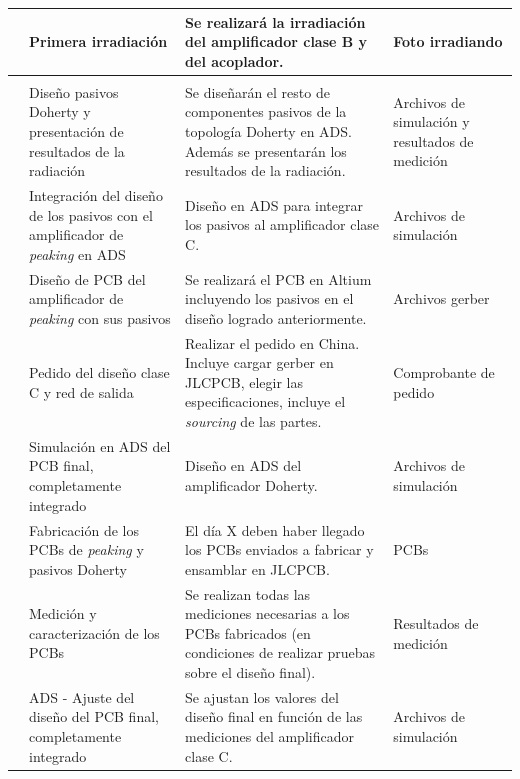 \begin{xltabular}{\textwidth}{>{\centering\arraybackslash}p{0.6cm} X X p{2.5cm}}
     & Primera irradiación & Se realizará la irradiación del amplificador clase B y del acoplador. & Foto irradiando \\
    
    \hline
      \\
    
     & Diseño pasivos Doherty y presentación de resultados de la radiación & Se diseñarán el resto de componentes pasivos de la topología Doherty en ADS. Además se presentarán los resultados de la radiación. & Archivos de simulación y resultados de medición \\
    
     & Integración del diseño de los pasivos con el amplificador de \textit{peaking} en ADS & Diseño en ADS para integrar los pasivos al amplificador clase C. & Archivos de simulación \\
    
     & Diseño de PCB del amplificador de \textit{peaking} con sus pasivos & Se realizará el PCB en Altium incluyendo los pasivos en el diseño logrado anteriormente. & Archivos gerber \\
    
     & Pedido del diseño clase C y red de salida & Realizar el pedido en China. Incluye cargar gerber en JLCPCB, elegir las especificaciones, incluye el \textit{sourcing} de las partes. & Comprobante de pedido \\
    
     & Simulación en ADS del PCB final, completamente integrado & Diseño en ADS del amplificador Doherty. & Archivos de simulación \\
    
     & Fabricación de los PCBs de \textit{peaking} y pasivos Doherty & El día X deben haber llegado los PCBs enviados a fabricar y ensamblar en JLCPCB. & PCBs \\
    
     & Medición y caracterización de los PCBs & Se realizan todas las mediciones necesarias a los PCBs fabricados (en condiciones de realizar pruebas sobre el diseño final). & Resultados de medición \\
    
     & ADS - Ajuste del diseño del PCB final, completamente integrado & Se ajustan los valores del diseño final en función de las mediciones del amplificador clase C. & Archivos de simulación \\
    

\end{xltabular}

